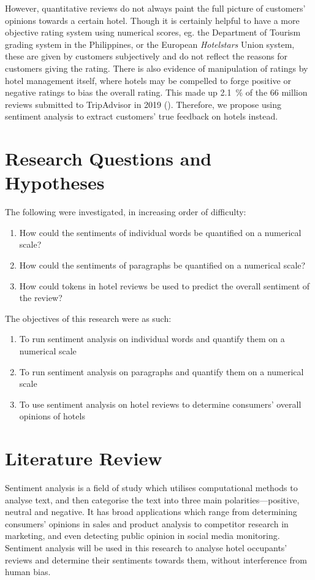 \documentclass[12pt, a4paper]{pancake-article}
\begin{document}
However, quantitative reviews do not always paint the full picture of customers'
opinions towards a certain hotel. Though it is certainly helpful to have a more
objective rating system using numerical scores, eg. the Department of Tourism
grading system in the Philippines, or the European \textit{Hotelstars} Union system,
these are given by customers subjectively and do not reflect the reasons for
customers giving the rating. There is also evidence of manipulation of ratings
by hotel management itself, where hotels may be compelled to forge positive or
negative ratings to bias the overall rating. This made up \qty{2.1}{\percent}
of the 66 million reviews submitted to TripAdvisor in 2019 (\cite{tripadvisor}).
Therefore, we propose using sentiment analysis to extract customers' true
feedback on hotels instead.

\section{Research Questions and Hypotheses}
The following were investigated, in increasing order of difficulty:
\begin{enumerate}
	\item How could the sentiments of individual words be quantified on a numerical scale?
	\item How could the sentiments of paragraphs be quantified on a numerical scale?
	\item How could tokens in hotel reviews be used to predict the overall sentiment of the review?
\end{enumerate}

The objectives of this research were as such:
\begin{enumerate}
	\item To run sentiment analysis on individual words and quantify them on a numerical scale
	\item To run sentiment analysis on paragraphs and quantify them on a numerical scale
	\item To use sentiment analysis on hotel reviews to determine consumers' overall opinions of hotels
\end{enumerate}

\section{Literature Review}
Sentiment analysis is a field of study which utilises computational methods to analyse text,
and then categorise the text into three main polarities---positive, neutral and negative. It
has broad applications which range from determining consumers' opinions in sales and product
analysis to competitor research in marketing, and even detecting public opinion in social media
monitoring. Sentiment analysis will be used in this research to analyse hotel occupants' reviews
and determine their sentiments towards them, without interference from human bias.
\end{document}
